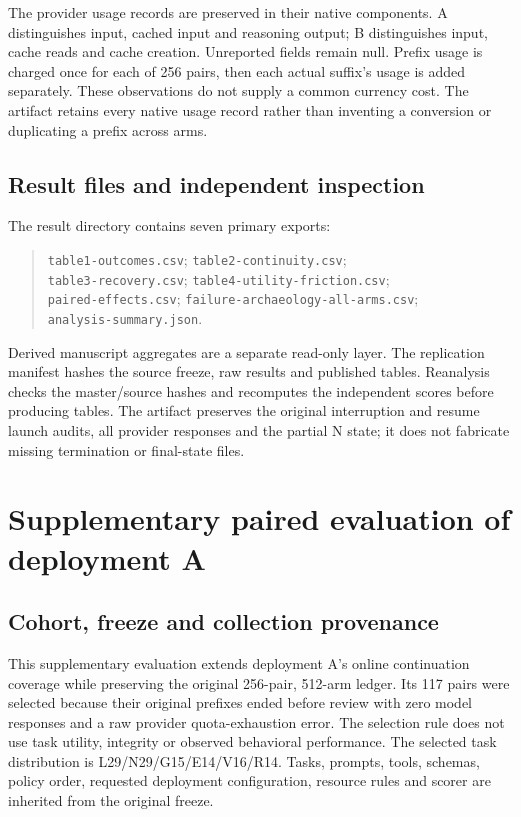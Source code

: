 \documentclass[11pt,a4paper]{article}
\newcommand{\code}[1]{\nolinkurl{#1}}
\begin{document}
The provider usage records are preserved in their native components. A distinguishes input, cached input and reasoning output; B distinguishes input, cache reads and cache creation. Unreported fields remain null. Prefix usage is charged once for each of 256 pairs, then each actual suffix's usage is added separately. These observations do not supply a common currency cost. The artifact retains every native usage record rather than inventing a conversion or duplicating a prefix across arms.

\subsection{Result files and independent inspection}
The result directory contains seven primary exports:
\begin{quote}\small
\code{table1-outcomes.csv}; \code{table2-continuity.csv};\\
\code{table3-recovery.csv}; \code{table4-utility-friction.csv};\\
\code{paired-effects.csv}; \code{failure-archaeology-all-arms.csv};\\
\code{analysis-summary.json}.
\end{quote}
Derived manuscript aggregates are a separate read-only layer. The replication manifest hashes the source freeze, raw results and published tables. Reanalysis checks the master/source hashes and recomputes the independent scores before producing tables. The artifact preserves the original interruption and resume launch audits, all provider responses and the partial N state; it does not fabricate missing termination or final-state files.

\section{Supplementary paired evaluation of deployment A}
\label{app:quota-recovery}
\subsection{Cohort, freeze and collection provenance}
This supplementary evaluation extends deployment A's online continuation coverage while preserving the original 256-pair, 512-arm ledger. Its 117 pairs were selected because their original prefixes ended before review with zero model responses and a raw provider quota-exhaustion error. The selection rule does not use task utility, integrity or observed behavioral performance. The selected task distribution is L29/N29/G15/E14/V16/R14. Tasks, prompts, tools, schemas, policy order, requested deployment configuration, resource rules and scorer are inherited from the original freeze.
\end{document}
